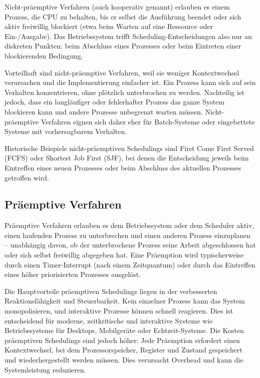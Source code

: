 Nicht-präemptive Verfahren (auch kooperativ genannt) erlauben es einem Prozess, die CPU zu behalten, bis er selbst die Ausführung beendet oder sich aktiv freiwillig blockiert (etwa beim Warten auf eine Ressource oder Ein-/Ausgabe). Das Betriebssystem trifft Scheduling-Entscheidungen also nur an diskreten Punkten: beim Abschluss eines Prozesses oder beim Eintreten einer blockierenden Bedingung.

Vorteilhaft sind nicht-präemptive Verfahren, weil sie weniger Kontextwechsel verursachen und die Implementierung einfacher ist. Ein Prozess kann sich auf sein Verhalten konzentrieren, ohne plötzlich unterbrochen zu werden. Nachteilig ist jedoch, dass ein langläufiger oder fehlerhafter Prozess das ganze System blockieren kann und andere Prozesse unbegrenzt warten müssen. Nicht-präemptive Verfahren eignen sich daher eher für Batch-Systeme oder eingebettete Systeme mit vorhersagbarem Verhalten.

Historische Beispiele nicht-präemptiven Schedulings sind First Come First Served (FCFS) oder Shortest Job First (SJF), bei denen die Entscheidung jeweils beim Eintreffen eines neuen Prozesses oder beim Abschluss des aktuellen Prozesses getroffen wird.

\subsection{Präemptive Verfahren}

Präemptive Verfahren erlauben es dem Betriebssystem oder dem Scheduler aktiv, einen laufenden Prozess zu unterbrechen und einen anderen Prozess einzuplanen – unabhängig davon, ob der unterbrochene Prozess seine Arbeit abgeschlossen hat oder sich selbst freiwillig abgegeben hat. Eine Präemption wird typischerweise durch einen Timer-Interrupt (nach einem Zeitquantum) oder durch das Eintreffen eines höher priorisierten Prozesses ausgelöst.

Die Hauptvorteile präemptiven Schedulings liegen in der verbesserten Reaktionsfähigkeit und Steuerbarkeit. Kein einzelner Prozess kann das System monopolisieren, und interaktive Prozesse können schnell reagieren. Dies ist entscheidend für moderne, zeitkritische und interaktive Systeme wie Betriebssysteme für Desktops, Mobilgeräte oder Echtzeit-Systeme. Die Kosten präemptiven Schedulings sind jedoch höher: Jede Präemption erfordert einen Kontextwechsel, bei dem Prozessorspeicher, Register und Zustand gespeichert und wiederhergestellt werden müssen. Dies verursacht Overhead und kann die Systemleistung reduzieren.

